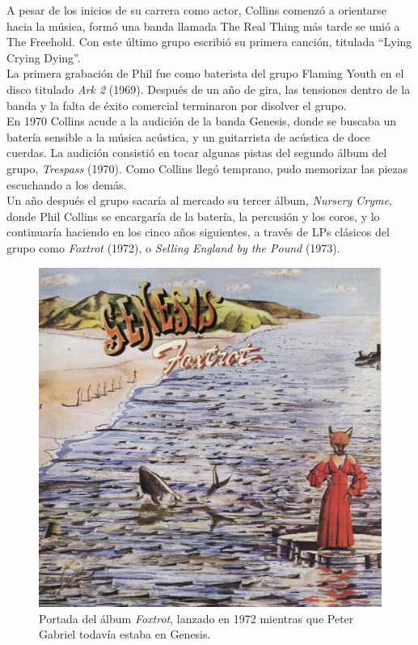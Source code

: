 \documentclass[11pt, oneside]{book}
\begin{document}
  A pesar de los inicios de su carrera como actor, Collins comenzó a orientarse hacia la música, formó una banda llamada The Real Thing más tarde se unió a The Freehold. Con este último grupo escribió su primera canción, titulada ``Lying Crying Dying''.\\

  La primera grabación de Phil fue como baterista del grupo Flaming Youth en el disco titulado \emph{Ark 2} (1969). Después de un año de gira, las tensiones dentro de la banda y la falta de éxito comercial terminaron por disolver el grupo.\\

  En 1970 Collins acude a la audición de la banda Genesis, donde se buscaba un batería sensible a la música acústica, y un guitarrista de acústica de doce cuerdas. La audición consistió en tocar algunas pistas del segundo álbum del grupo, \emph{Trespass} (1970). Como Collins llegó temprano, pudo memorizar las piezas escuchando a los demás.\\

  Un año después el grupo sacaría al mercado su tercer álbum, \emph{Nursery Cryme}, donde Phil Collins se encargaría de la batería, la percusión y los coros, y lo continuaría haciendo en los cinco años siguientes, a través de LPs clásicos del grupo como \emph{Foxtrot} (1972), o \emph{Selling England by the Pound} (1973).\\

  \begin{figure}
    \begin{center}
      \includegraphics[scale = 0.4]{img/02.jpg}
    \end{center}
    \caption*{Portada del álbum \emph{Foxtrot}, lanzado en 1972 mientras que Peter Gabriel todavía estaba en Genesis.}
  \end{figure}
\end{document}
